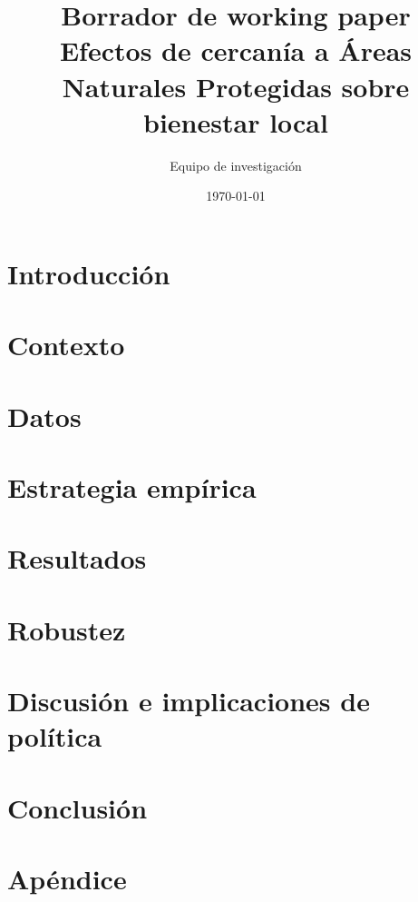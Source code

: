 \documentclass[12pt]{article}
\title{\textbf{Borrador de working paper}\\
Efectos de cercanía a Áreas Naturales Protegidas sobre bienestar local}
\author{Equipo de investigación}
\date{\today}
\begin{document}
\maketitle

\begin{abstract}
\end{abstract}

\section{Introducción}

\section{Contexto}

\section{Datos}

\section{Estrategia empírica}

\section{Resultados}

\section{Robustez}

\section{Discusión e implicaciones de política}

\section{Conclusión}




\appendix
\section{Apéndice}
\end{document}

